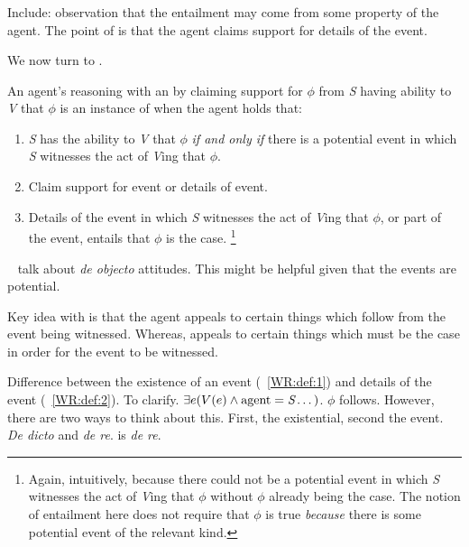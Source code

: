 \subsubsection{\WR{}}
\label{sec:wr-1}

\begin{note}[\WR{} def.]
  {
    \color{red}
    Include: observation that the entailment may come from some property of the agent.
    The point of \WR{} is that the agent claims support for details of the event.
  }

  We now turn to \WR{}.
  \begin{definition}[\WR{}]
        An agent's reasoning with an \aben{} by claiming support for \(\phi\) from \emph{S} having ability to \emph{V} that \(\phi\) is an instance of \emph{\WR{}} when the agent holds that:
    \begin{enumerate}
    \item\label{WR:def:1} \emph{S} has the ability to \emph{V} that \(\phi\) \emph{if and only if} there is a potential event in which \emph{S} witnesses the act of \emph{V}ing that \(\phi\).
    \item\label{WR:def:2} Claim support for event or details of event.
    \item\label{WR:def:3} Details of the event in which \emph{S} witnesses the act of \emph{V}ing that \(\phi\), or part of the event, entails that \(\phi\) is the case.\nolinebreak
      \footnote{Again, intuitively, because there could not be a potential event in which \emph{S} witnesses the act of \emph{V}ing that \(\phi\) without \(\phi\) already being the case.
      The notion of entailment here does not require that \(\phi\) is true \emph{because} there is some potential event of the relevant kind.}
    \end{enumerate}
  \end{definition}

  {
    \color{red}
    ~\textcite{Rebuschi:2011ub} talk about \emph{de objecto} attitudes.
    This might be helpful given that the events are potential.
  }

  {
    \color{red}
    Key idea with \WR{} is that the agent appeals to certain things which follow from the event being witnessed.
    Whereas, \AR{} appeals to certain things which must be the case in order for the event to be witnessed.
  }

  {
    \color{red}
    Difference between the existence of an event (~\ref{WR:def:1}) and details of the event (~\ref{WR:def:2}).
    To clarify.
    \(\exists e(V(e) \land \text{agent} = \emph{S} \dots)\).
    \(\phi\) follows.
    However, there are two ways to think about this.
    First, the existential, second the event.
    \emph{De dicto} and \emph{de re}.
    \WR{} is \emph{de re}.

}
\end{note}
